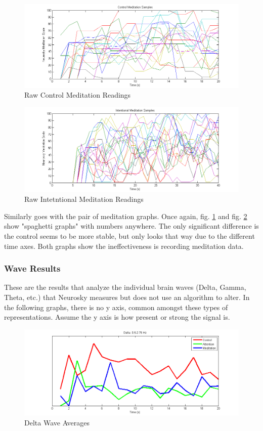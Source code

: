 \documentclass[journal]{IEEEtran}
\begin{document}
\begin{figure}[H]
    \centering
    \includegraphics[width=.5\textwidth]{EEG/all_meditations_control}
    \caption{Raw Control Meditation Readings}
    \label{a_m_c}
\end{figure} 

\begin{figure}[H]
    \centering
    \includegraphics[width=.5\textwidth]{EEG/all_meditations_intentional}
    \caption{Raw Intetntional Meditation Readings}
    \label{a_m_i}
\end{figure}


Similarly goes with the pair of meditation graphs. Once again, fig. \ref{a_m_c} and fig. \ref{a_m_i} show "spaghetti graphs" with numbers anywhere. The only significant difference is the control seems to be more stable, but only looks that way due to the different time axes. Both graphs show the ineffectiveness is recording meditation data. \par

\vspace{5mm}

\subsubsection{Wave Results}
These are the results that analyze the individual brain waves (Delta, Gamma, Theta, etc.) that Neurosky measures but does not use an algorithm to alter. In the following graphs, there is no y axis, common amongst these types of representations. Assume the y axis is how present or strong the signal is. \par

\begin{figure}[H]
    \centering
    \includegraphics[width=.5\textwidth]{EEG/wave1}
    \caption{Delta Wave Averages}
    \label{w1}
\end{figure}
\end{document}

